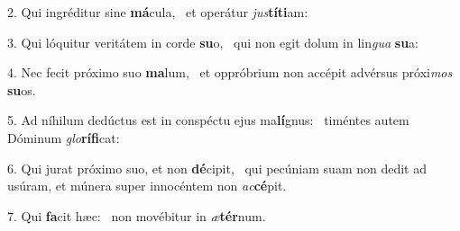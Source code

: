 2. Qui ingréditur sine \textbf{má}cula, \ast\  et operátur \textit{jus}\textbf{tí}\textbf{ti}am:\

3. Qui lóquitur veritátem in corde \textbf{su}o, \ast\  qui non egit dolum in lin\textit{gua} \textbf{su}a:\

4. Nec fecit próximo suo \textbf{ma}lum, \ast\  et oppróbrium non accépit advérsus próxi\textit{mos} \textbf{su}os.\

5. Ad níhilum dedúctus est in conspéctu ejus ma\textbf{lí}gnus: \ast\  timéntes autem Dóminum \textit{glo}\textbf{rí}\textbf{fi}cat:\

6. Qui jurat próximo suo, et non \textbf{dé}cipit, \ast\  qui pecúniam suam non dedit ad usúram, et múnera super innocéntem non \textit{ac}\textbf{cé}pit.\

7. Qui \textbf{fa}cit hæc: \ast\  non movébitur in \textit{æ}\textbf{tér}num.\

